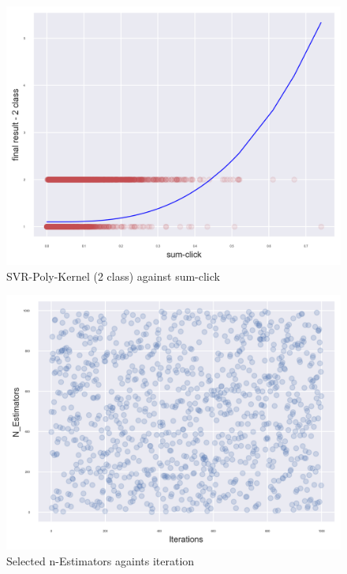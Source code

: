 \documentclass[11pt, a4paper]{article}
\begin{document}
\begin{multicols}{2}
\begin{figure}[H]
	\includegraphics[width=\linewidth]{SVR-Polynomial-Kernel_2_class_model_against_sum-click.png} 
	\caption{SVR-Poly-Kernel (2 class) against sum-click}
	\label{fig:PolyClicks}
\end{figure}
\centering
\begin{figure}[H]
	\includegraphics[width=\linewidth]{Estimators_against_iteration.png} 
	\caption{Selected n-Estimators againts iteration}
	\label{fig:estimators}
\end{figure}
\centering
\begin{figure}[H]

\end{figure}
\end{multicols}
\end{document}
